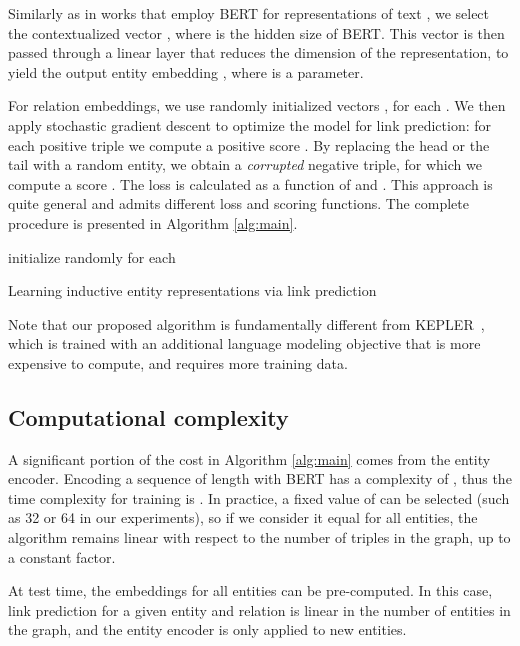 \documentclass[sigconf]{acmart}
\begin{document}
Similarly as in works that employ BERT for representations of text \citep{reimers2019sentence,wang2019kepler}, we select the contextualized vector , where  is the hidden size of BERT. This vector is then passed through a linear layer that reduces the dimension of the representation, to yield the output entity embedding , where  is a parameter.

For relation embeddings, we use randomly initialized vectors , for each . We then apply stochastic gradient descent to optimize the model for link prediction: for each positive triple  we compute a positive score . By replacing the head or the tail with a random entity, we obtain a \textit{corrupted} negative triple, for which we compute a score . The loss is calculated as a function of  and . This approach is quite general and admits different loss and scoring functions. The complete procedure is presented in Algorithm \ref{alg:main}.

\begin{algorithm}[t]
  initialize randomly for each \;
 \;
 \Return{}
 \caption{Learning inductive entity representations via link prediction}
 \label{alg:main}
\end{algorithm}

Note that our proposed algorithm is fundamentally different from KEPLER~\citep{wang2019kepler}, which is trained with an additional language modeling objective that is more expensive to compute, and requires more training data.

\subsection{Computational complexity}

A significant portion of the cost in Algorithm \ref{alg:main} comes from the entity encoder. Encoding a sequence of length  with BERT has a complexity of , thus the time complexity for training is . In practice, a fixed value of  can be selected (such as 32 or 64 in our experiments), so if we consider it equal for all entities, the algorithm remains linear with respect to the number of triples in the graph, up to a constant factor.

At test time, the embeddings for all entities can be pre-computed. In this case, link prediction for a given entity and relation is linear in the number of entities in the graph, and the entity encoder is only applied to new entities.
\end{document}
